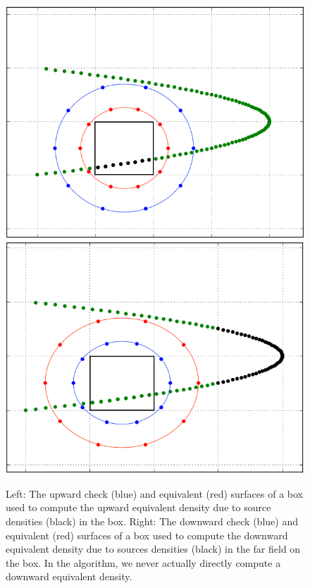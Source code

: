 \documentclass[12pt,letterpaper]{article}
\begin{document}
\begin{figure}[!ht]
\begin{center}
\includegraphics[scale=0.5]{ued-curve}
\includegraphics[scale=0.5]{ded-curve}
\end{center}
\caption{Left: The upward check (blue) and equivalent (red) surfaces of a box used to compute the upward equivalent density due to source densities (black) in the box. Right: The downward check (blue) and equivalent (red) surfaces of a box used to compute the downward equivalent density due to sources densities (black) in the far field on the box. In the algorithm, we never actually directly compute a downward equivalent density.}
\end{figure}
\end{document}
